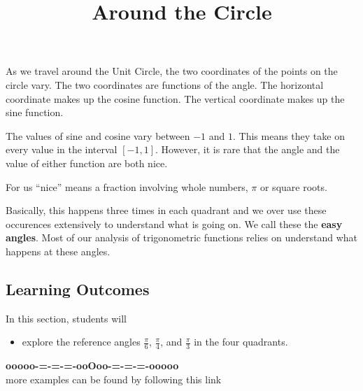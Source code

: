 \documentclass{ximera}
\title{Around the Circle}
\begin{document}
\begin{abstract}
\end{abstract}
\maketitle



As we travel around the Unit Circle, the two coordinates of the points on the circle vary.  The two coordinates are functions of the angle.   The horizontal coordinate makes up the cosine function. The vertical coordinate makes up the sine function.  


The values of sine and cosine vary between $-1$ and $1$.  This means they take on every value in the interval $[-1, 1]$.  However, it is rare that the angle and the value of either function are both nice. 


For us ``nice'' means a fraction involving whole numbers, $\pi$ or square roots. 


Basically, this happens three times in each quadrant and we over use these occurences extensively to understand what is going on.  We call these the \textbf{easy angles}.  Most of our analysis of trigonometric functions relies on understand what happens at these angles.
















\subsection*{Learning Outcomes}

\begin{sectionOutcomes}
In this section, students will 

\begin{itemize}
\item explore the reference angles $\frac{\pi}{6}$, $\frac{\pi}{4}$, and $\frac{\pi}{3}$ in the four quadrants.
\end{itemize}
\end{sectionOutcomes}











\begin{center}
\textbf{\textcolor{green!50!black}{ooooo-=-=-=-ooOoo-=-=-=-ooooo}} \\

more examples can be found by following this link\\ 

\end{center}
\end{document}
